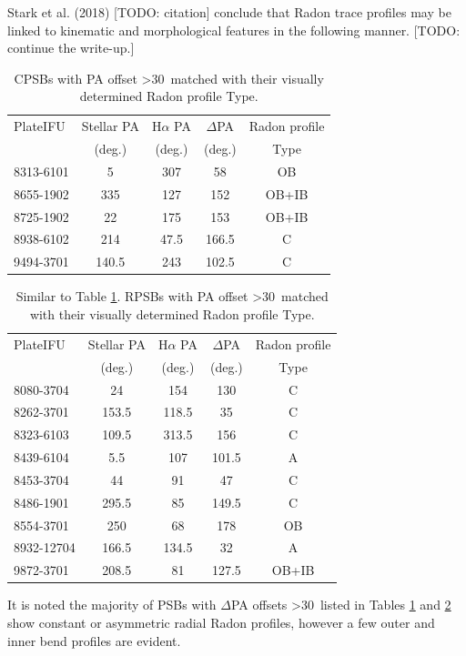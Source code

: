 Stark et al. (2018) [TODO: citation] conclude that Radon trace profiles may be linked to kinematic and morphological features in the following manner. [TODO: continue the write-up.]


\begin{table}
\centering
\caption{CPSBs with PA offset \textgreater 30\textdegree\ matched with their visually determined Radon profile Type.}
\label{tab:offsetCPSBs-Radon-Type}
\begin{tabular}{lcccc}
\hline
PlateIFU  & Stellar PA & H$\alpha$ PA & $\Delta$PA & Radon profile\\
  & (deg.) & (deg.) & (deg.) & Type \\
\hline
8313-6101 & 5 & 307 & 58 & OB \\
8655-1902 & 335 & 127 & 152 & OB+IB \\
8725-1902 & 22 & 175 & 153 & OB+IB \\
8938-6102 & 214 & 47.5 & 166.5 & C \\
9494-3701 & 140.5 & 243 & 102.5 & C \\
\hline
\end{tabular}
\end{table}

\begin{table}
\centering
\caption[RPSBs with PA offset \textgreater 30\textdegree\ matched with their visually determined Radon profile Type]{Similar to Table \ref{tab:offsetCPSBs-Radon-Type}. RPSBs with PA offset \textgreater 30\textdegree\ matched with their visually determined Radon profile Type.}
\label{tab:offsetRPSBs-Radon-Type}
\begin{tabular}{lcccc}
\hline
PlateIFU   & Stellar PA & H$\alpha$ PA & $\Delta$PA & Radon profile \\
  & (deg.) & (deg.) & (deg.) & Type\\
\hline
8080-3704 & 24 & 154 & 130 & C \\
8262-3701 & 153.5 & 118.5 & 35 & C \\
8323-6103 & 109.5 & 313.5 & 156 & C \\
8439-6104 & 5.5 & 107 & 101.5 & A \\
8453-3704 & 44 & 91 & 47 & C \\
8486-1901 & 295.5 & 85 & 149.5 & C \\
8554-3701 & 250 & 68 & 178 & OB \\
8932-12704 & 166.5 & 134.5 & 32 & A \\
9872-3701 & 208.5 & 81 & 127.5 & OB+IB \\
\hline
\end{tabular}
\end{table}

It is noted the majority of PSBs with $\Delta$PA offsets \textgreater 30\textdegree\ listed in Tables \ref{tab:offsetCPSBs-Radon-Type} and \ref{tab:offsetRPSBs-Radon-Type} show constant or asymmetric radial Radon profiles, however a few outer and inner bend profiles are evident. 

